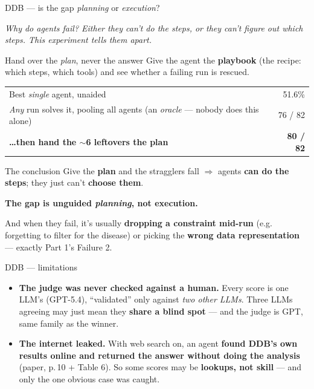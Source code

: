 \documentclass[9pt,aspectratio=169]{beamer}
\newcommand{\gd}[1]{\textcolor{unigreen}{\textbf{#1}}}
\newcommand{\rd}[1]{\textcolor{unired}{\textbf{#1}}}
\newcommand{\sm}[1]{{\color{unigrey}\small #1}}
\newcommand{\why}[1]{{\color{unigrey}\footnotesize\itshape #1\par\vspace{4pt}}}
\begin{document}
\begin{frame}{DDB --- is the gap \emph{planning} or \emph{execution}?}
\why{Why do agents fail? Either they can't \emph{do} the steps, or they can't \emph{figure out} which steps. This experiment tells them apart.}
\begin{block}{Hand over the \emph{plan}, never the answer}
Give the agent the \textbf{playbook} \sm{(the recipe: which steps, which tools)} and see whether a failing
run is rescued.
\end{block}
\vfill
\centering\small
\begin{tabular}{@{}lr@{}}
\toprule
Best \emph{single} agent, unaided & 51.6\% \\
\emph{Any} run solves it, pooling all agents \sm{(an \emph{oracle} --- nobody does this alone)} & 76 / 82 \\
\rd{\ldots{}then hand the $\sim$6 leftovers the plan} & \gd{80 / 82} \\
\bottomrule
\end{tabular}
\vfill
\begin{alertblock}{The conclusion}
Give the \textbf{plan} and the stragglers fall $\Rightarrow$ agents \textbf{can do the steps}; they just
can't \textbf{choose them}.
\medskip

\centering\textbf{The gap is unguided \emph{planning}, not execution.}
\medskip

\raggedright\sm{And when they fail, it's usually \textbf{dropping a constraint mid-run} \sm{(e.g. forgetting to filter for the disease)} or picking the \textbf{wrong data representation} --- exactly Part 1's Failure 2.}
\end{alertblock}
\end{frame}

\begin{frame}{DDB --- limitations}
\begin{itemize}\footnotesize
  \item \rd{\textbf{The judge was never checked against a human.}} Every score is one LLM's (GPT-5.4),
        ``validated'' only against \emph{two other LLMs}. Three LLMs agreeing may just mean they \textbf{share a
        blind spot} --- \sm{and the judge is GPT, same family as the winner.}
  \item \rd{\textbf{The internet leaked.}} With web search on, an agent \textbf{found DDB's own results online
        and returned the answer without doing the analysis} \sm{(paper, p.\,10 + Table 6)}. So some scores may be
        \textbf{lookups, not skill} --- and only the one obvious case was caught.
\end{itemize}
\end{frame}
\end{document}
